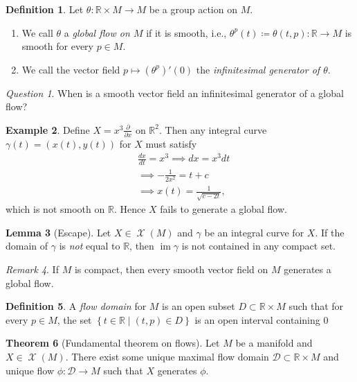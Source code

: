 \documentclass[10pt,letterpaper,cm]{nupset}
\theoremstyle{definition}
\newtheorem{definition}{Definition}[subsection]
\newtheorem{exmp}[definition]{Example}
\theoremstyle{theorem}
\newtheorem{theorem}[definition]{Theorem}
\newtheorem{lemma}[definition]{Lemma}
\theoremstyle{remark}
\newtheorem{remark}[definition]{Remark}
\newtheorem*{question}{Question}
\newcommand{\R}{\mathbb R}
\newcommand{\1}{\mathbf{1}}
\newcommand{\0}{\vec 0}
\DeclareMathOperator{\im}{im}
\DeclareMathOperator{\vf}{\mathscr{X}}
\begin{document}
\begin{definition}
Let $\theta : \R \times M \to M$ be a group action on $M$. 
\begin{enumerate}
\item We call $\theta$ a \textit{global flow on $M$} if it is smooth, i.e., $\theta^p(t)\coloneqq  \theta(t, p) : \R \to M$ is smooth for every $p\in M$.
\item We call the vector field $p\mapsto  (\theta^p)'(0)$  the \textit{infinitesimal generator of $\theta$}.
\end{enumerate}
\end{definition}

\begin{question}
When is a smooth vector field an infinitesimal generator of  a global flow?
\end{question}

\begin{exmp}
Define $X = x^3\frac{\partial}{\partial{x}}$ on $\R^2$. Then any integral curve $\gamma (t) = \left(x(t), y(t)\right)$ for $X$ must satisfy
\begin{align*}
& \frac{dx}{dt} = x^3
 \implies  dx = x^3dt
\\ & \implies {-\frac{1}{2x^2}} = t+c
\\ & \implies x(t) = \frac{1}{\sqrt{c-2t}},
\end{align*}
which is not smooth on $\R$. Hence $X$ fails to generate a global flow.
\end{exmp}

\begin{lemma}[Escape]
Let $X \in \vf(M)$ and $\gamma$ be an integral curve for $X$. If the domain of $\gamma$ is \emph{not} equal to $\R$, then $\im \gamma$ is not contained in any compact set.
\end{lemma}

\begin{remark}
If $M$ is compact, then every smooth vector field on $M$ generates a global flow.
\end{remark}

\begin{definition}
A \textit{flow domain} for $M$ is an open subset $D\subset \R \times M$ such that for every $p\in M$, the set $\left\{t\in \R \mid \left(t, p\right) \in D\right\}$ is an open interval containing $0$
\end{definition}

\begin{theorem}[Fundamental theorem on flows]
Let $M$ be a manifold and $X\in \vf(M)$. There exist some unique maximal flow domain $\mathcal{D}\subset \R \times M$ and unique flow $\phi: \mathcal{D}  \to M$ such that $X$ generates $\phi$.
\end{theorem}
\end{document}
